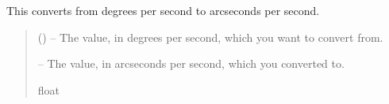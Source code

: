 \documentclass[letterpaper,11pt,english]{sphinxmanual}
\begin{document}
\begin{savenotes}\begin{fulllineitems}
\label{\detokenize{code/opihiexarata.library.conversion:opihiexarata.library.conversion.degrees_per_second_to_arcsec_per_second}}
\pysigstartsignatures
{}
\pysigstopsignatures
\sphinxAtStartPar
This converts from degrees per second to arcseconds per second.
\begin{quote}\begin{description}
\sphinxAtStartPar
{} () – The value, in degrees per second, which you want to convert from.

\sphinxAtStartPar
{} – The value, in arcseconds per second, which you converted to.

\sphinxAtStartPar
float

\end{description}\end{quote}

\end{fulllineitems}\end{savenotes}

\end{document}
